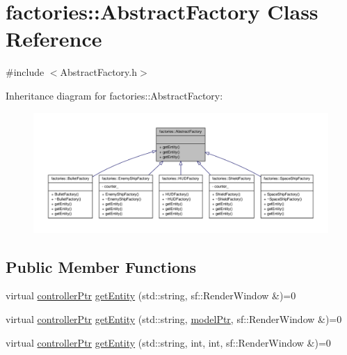 \hypertarget{classfactories_1_1AbstractFactory}{\section{factories\-:\-:\-Abstract\-Factory \-Class \-Reference}
\label{d4/d92/classfactories_1_1AbstractFactory}
}


{\ttfamily \#include $<$\-Abstract\-Factory.\-h$>$}



\-Inheritance diagram for factories\-:\-:\-Abstract\-Factory\-:\nopagebreak
\begin{figure}[H]
\begin{center}
\leavevmode
\includegraphics[width=350pt]{da/db6/classfactories_1_1AbstractFactory__inherit__graph}
\end{center}
\end{figure}
\subsection*{\-Public \-Member \-Functions}
\begin{DoxyCompactItemize}
\item 
virtual \hyperlink{Game_8h_a21b04f6cf2d5990b82725fac5ea2ce9a}{controller\-Ptr} \hyperlink{classfactories_1_1AbstractFactory_a18220cbcb9acb58ee704142f33975abe}{get\-Entity} (std\-::string, sf\-::\-Render\-Window \&)=0
\item 
virtual \hyperlink{Game_8h_a21b04f6cf2d5990b82725fac5ea2ce9a}{controller\-Ptr} \hyperlink{classfactories_1_1AbstractFactory_a916e94392336a3e6a28a090faeb62b8b}{get\-Entity} (std\-::string, \hyperlink{ModelView_8h_a78966ddb517fca8d2b29a2bc5c31e74e}{model\-Ptr}, sf\-::\-Render\-Window \&)=0
\item 
virtual \hyperlink{Game_8h_a21b04f6cf2d5990b82725fac5ea2ce9a}{controller\-Ptr} \hyperlink{classfactories_1_1AbstractFactory_a5f440d7b3410e85f7079dac8326ae06c}{get\-Entity} (std\-::string, int, int, sf\-::\-Render\-Window \&)=0
\end{DoxyCompactItemize}


